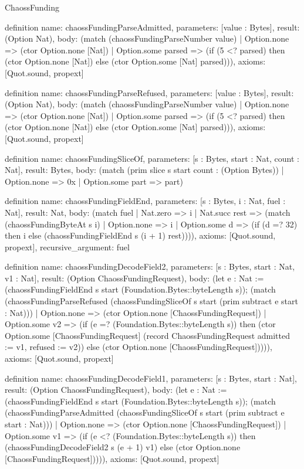 \begin{lexlean}{ChaossFunding}
\begin{semanticmodule}
definition{
  name: chaossFundingParseAdmitted,
  parameters: [value : Bytes],
  result: (Option Nat),
  body: (match (chaossFundingParseNumber value)
    | Option.none => (ctor Option.none [Nat])
    | Option.some parsed => (if (5 <? parsed) then (ctor Option.none [Nat]) else (ctor Option.some [Nat] parsed))),
  axioms: [Quot.sound, propext]
}

definition{
  name: chaossFundingParseRefused,
  parameters: [value : Bytes],
  result: (Option Nat),
  body: (match (chaossFundingParseNumber value)
    | Option.none => (ctor Option.none [Nat])
    | Option.some parsed => (if (5 <? parsed) then (ctor Option.none [Nat]) else (ctor Option.some [Nat] parsed))),
  axioms: [Quot.sound, propext]
}

definition{
  name: chaossFundingSliceOf,
  parameters: [s : Bytes, start : Nat, count : Nat],
  result: Bytes,
  body: (match (prim slice s start count : (Option Bytes))
    | Option.none => 0x
    | Option.some part => part)
}

definition{
  name: chaossFundingFieldEnd,
  parameters: [s : Bytes, i : Nat, fuel : Nat],
  result: Nat,
  body: (match fuel
    | Nat.zero => i
    | Nat.succ rest => (match (chaossFundingByteAt s i)
      | Option.none => i
      | Option.some d => (if (d =? 32) then i else (chaossFundingFieldEnd s (i + 1) rest)))),
  axioms: [Quot.sound, propext],
  recursive_argument: fuel
}

definition{
  name: chaossFundingDecodeField2,
  parameters: [s : Bytes, start : Nat, v1 : Nat],
  result: (Option ChaossFundingRequest),
  body: (let e : Nat := (chaossFundingFieldEnd s start (Foundation.Bytes::byteLength s)); (match (chaossFundingParseRefused (chaossFundingSliceOf s start (prim subtract e start : Nat)))
    | Option.none => (ctor Option.none [ChaossFundingRequest])
    | Option.some v2 => (if (e =? (Foundation.Bytes::byteLength s)) then (ctor Option.some [ChaossFundingRequest] (record ChaossFundingRequest {admitted := v1, refused := v2})) else (ctor Option.none [ChaossFundingRequest])))),
  axioms: [Quot.sound, propext]
}

definition{
  name: chaossFundingDecodeField1,
  parameters: [s : Bytes, start : Nat],
  result: (Option ChaossFundingRequest),
  body: (let e : Nat := (chaossFundingFieldEnd s start (Foundation.Bytes::byteLength s)); (match (chaossFundingParseAdmitted (chaossFundingSliceOf s start (prim subtract e start : Nat)))
    | Option.none => (ctor Option.none [ChaossFundingRequest])
    | Option.some v1 => (if (e <? (Foundation.Bytes::byteLength s)) then (chaossFundingDecodeField2 s (e + 1) v1) else (ctor Option.none [ChaossFundingRequest])))),
  axioms: [Quot.sound, propext]
}


\end{semanticmodule}
\end{lexlean}
